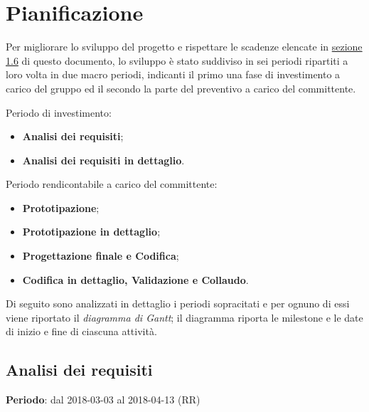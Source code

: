 \newpage
\section{Pianificazione}

Per migliorare lo sviluppo del progetto e rispettare le scadenze elencate in \hyperref[Scadenze]{sezione 1.6} di questo documento, lo sviluppo è stato suddiviso in sei periodi ripartiti a loro volta in due macro periodi, indicanti il primo una fase di investimento a carico del gruppo \Gruppo{} ed il secondo la parte del preventivo a carico del committente.

Periodo di investimento:
\begin{itemize}
\item \textbf{Analisi dei requisiti};
\item \textbf{Analisi dei requisiti in dettaglio}.
\end{itemize}
Periodo rendicontabile a carico del committente:
\begin{itemize}
\item \textbf{Prototipazione};
\item \textbf{Prototipazione in dettaglio};
\item \textbf{Progettazione finale e Codifica};
\item \textbf{Codifica in dettaglio, Validazione e Collaudo}.
\end{itemize}
Di seguito sono analizzati in dettaglio i periodi sopracitati e per ognuno di essi viene riportato il \emph{diagramma di Gantt}; il diagramma riporta le milestone e le date di inizio e fine di ciascuna attività.

\subsection{Analisi dei requisiti}
\textbf{Periodo}: dal 2018-03-03 al 2018-04-13 (RR)\\

